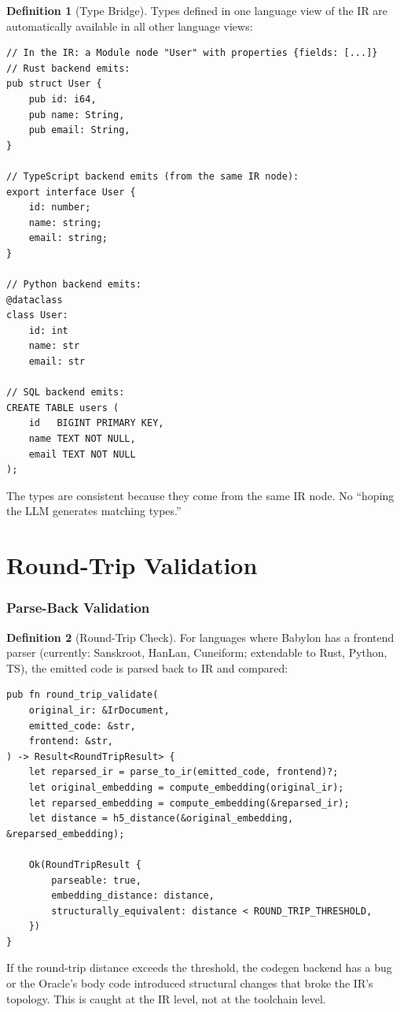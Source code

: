 \documentclass[11pt,a4paper,twoside]{article}
\theoremstyle{definition}
\newtheorem{definition}{Definition}[section]
\theoremstyle{plain}
\theoremstyle{remark}
\begin{document}
\begin{definition}[Type Bridge]\label{def:typebridge}
Types defined in one language view of the IR are automatically
available in all other language views:
\begin{lstlisting}
// In the IR: a Module node "User" with properties {fields: [...]}
// Rust backend emits:
pub struct User {
    pub id: i64,
    pub name: String,
    pub email: String,
}

// TypeScript backend emits (from the same IR node):
export interface User {
    id: number;
    name: string;
    email: string;
}

// Python backend emits:
@dataclass
class User:
    id: int
    name: str
    email: str

// SQL backend emits:
CREATE TABLE users (
    id   BIGINT PRIMARY KEY,
    name TEXT NOT NULL,
    email TEXT NOT NULL
);
\end{lstlisting}

The types are consistent because they come from the same IR node. No
``hoping the LLM generates matching types.''
\end{definition}


\part{Round-Trip Validation}\label{part:roundtrip}

\section{Parse-Back Validation}\label{sec:parseback}

\begin{definition}[Round-Trip Check]\label{def:roundtrip}
For languages where Babylon has a frontend parser (currently:
Sanskroot, HanLan, Cuneiform; extendable to Rust, Python, TS), the
emitted code is parsed back to IR and compared:
\begin{lstlisting}
pub fn round_trip_validate(
    original_ir: &IrDocument,
    emitted_code: &str,
    frontend: &str,
) -> Result<RoundTripResult> {
    let reparsed_ir = parse_to_ir(emitted_code, frontend)?;
    let original_embedding = compute_embedding(original_ir);
    let reparsed_embedding = compute_embedding(&reparsed_ir);
    let distance = h5_distance(&original_embedding, &reparsed_embedding);

    Ok(RoundTripResult {
        parseable: true,
        embedding_distance: distance,
        structurally_equivalent: distance < ROUND_TRIP_THRESHOLD,
    })
}
\end{lstlisting}

If the round-trip distance exceeds the threshold, the codegen backend
has a bug or the Oracle's body code introduced structural changes that
broke the IR's topology. This is caught at the IR level, not at the
toolchain level.
\end{definition}
\end{document}
